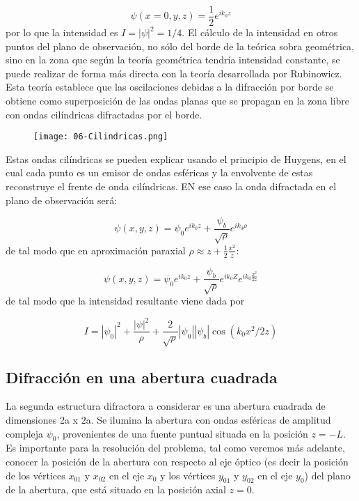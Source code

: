 \documentclass[12pt,a4paper]{book}
\numberwithin{equation}{section}
\numberwithin{figure}{section}
\newcommand{\1}{_{(1)}}
\newcommand{\2}{_{(2)}}
\theoremstyle{definition}
\begin{document}
\begin{equation}
    \psi (x=0,y,z) = \frac{1}{2} e^{ik_0z}
\end{equation}
por lo que la intensidad es $I=|\psi|^2=1/4$. El cálculo de la intensidad en otros puntos del plano de observación, no sólo del borde de la teórica sobra geométrica, sino en la zona que según la teoría geométrica tendría intensidad constante, se puede realizar de forma más directa con la teoría desarrollada por Rubinowicz. Esta teoría establece que las oscilaciones debidas a la difracción por borde se obtiene como superposición de las ondas planas que se propagan en la zona libre con ondas cilíndricas difractadas por el borde. \\

\begin{figure}[h!]
    \centering
    \texttt{[image: 06-Cilindricas.png]}
    \label{Fig:06.01-01}
    \caption{}
\end{figure}


Estas ondas cilíndricas se pueden explicar usando el principio de Huygens, en el cual cada punto es un emisor de ondas esféricas y la envolvente de estas reconstruye el frente de onda cilíndricas. EN ese caso la onda difractada en el plano de observación será:

\begin{equation}
    \psi (x,y,z) = \psi_0 e^{ik_0z} + \frac{\psi_b}{\sqrt{\rho}} e^{ik_0 \rho}
\end{equation}
de tal modo que en aproximación paraxial $\rho \approx z + \frac{1}{2} \frac{x^2}{z}$:

\begin{equation}
    \psi (x,y,z) = \psi_0 e^{ik_0z} + \frac{\psi_b}{\sqrt{\rho}} e^{ik_0Z} e^{ik_0 \frac{x^2}{2z}}
\end{equation}
de tal modo que la intensidad resultante viene dada por

\begin{equation}
    I = |\psi_0|^2 + \frac{|\psi|^2}{\rho} + \frac{2}{\sqrt{\rho}} |\psi_0||\psi_b|\cos (k_0x^2/2z)
\end{equation}

\subsection{Difracción en una abertura cuadrada}

La segunda estructura difractora a considerar es una abertura cuadrada de dimensiones 2a x 2a. Se ilumina la abertura con ondas esféricas de amplitud compleja $\psi_0$, provenientes de una fuente puntual situada en la posición $z=-L$. Es importante para la resolución del problema, tal como veremos más adelante, conocer la posición de la abertura con respecto al eje óptico (es decir la posición de los vértices $x_{01}$ y $x_{02}$ en el eje $x_0$ y los vértices $y_{01}$ y $y_{02}$ en el eje $y_0$) del plano de la abertura, que está situado en la posición axial $z=0$. \\
\end{document}
